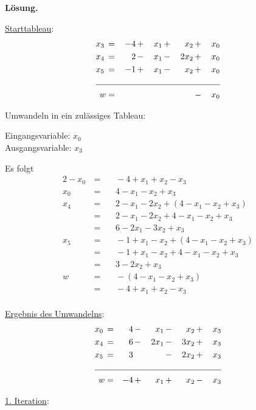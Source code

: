 \documentclass[10pt,a4paper,oneside,ngerman,numbers=noenddot]{scrartcl}
\begin{document}
		\textbf{Lösung.}
		
		\underline{Starttableau}:
		\begin{alignat*}{5}
			x_{3} \,&=&\, -4 \,&+&\, x_{1} \,&+&\, x_{2} \,&+&\, x_{0} \\
			x_{4} \,&=&\, 2 \,&-&\, x_{1} \,&-&\, 2x_{2} \,&+&\, x_{0} \\
			x_{5} \,&=&\, -1 \,&+&\, x_{1} \,&-&\, x_{2} \,&+&\, x_{0} \\ \cline{1 - 9}
			w &=& && && \,&-&\, x_{0}
		\end{alignat*}
		
		Umwandeln in ein zulässiges Tableau:
				
		Eingangsvariable: $x_{0}$\\
		Ausgangsvariable: $x_{3}$
		
		Es folgt
		\begin{alignat*}{2}
			-x_{0} \,&=&&\, -4 + x_{1} + x_{2} - x_{3} \\
			x_{0} \,&=&&\, 4 - x_{1} - x_{2} + x_{3} \\			
			x_{4} \,&=&&\, 2 - x_{1} - 2x_{2} + \left(4 - x_{1} - x_{2} + x_{3}\right) \\			
			&=&&\, 2 - x_{1} - 2x_{2} + 4 - x_{1} - x_{2} + x_{3} \\
			&=&&\, 6 - 2x_{1} - 3x_{2} + x_{3} \\
			x_{5} \,&=&&\, -1 + x_{1} - x_{2} + \left(4 - x_{1} - x_{2} + x_{3}\right) \\
			&=&&\, -1 + x_{1} - x_{2} + 4 - x_{1} - x_{2} + x_{3} \\
			&=&&\, 3 - 2x_{2} + x_{3} \\
			w \,&=&&\, -\left(4 - x_{1} - x_{2} + x_{3}\right) \\
			&=&&\, -4 + x_{1} + x_{2} - x_{3} \\
		\end{alignat*}
		
		\underline{Ergebnis des Umwandelns}:
		\begin{alignat*}{5}
			x_{0} \,&=&\, 4 \,&-&\, x_{1} \,&-&\, x_{2} \,&+&\, x_{3} \\
			x_{4} \,&=&\, 6 \,&-&\, 2x_{1} \,&-&\, 3x_{2} \,&+&\, x_{3} \\
			x_{5} \,&=&\, 3 \,&& &-&\, 2x_{2} \,&+&\, x_{3} \\ \cline{1 - 9}
			w &=& -4 \,&+&\, x_{1} \,&+&\, x_{2} \,&-&\, x_{3}
		\end{alignat*}
		
		\underline{1. Iteration}:
		
\end{document}
